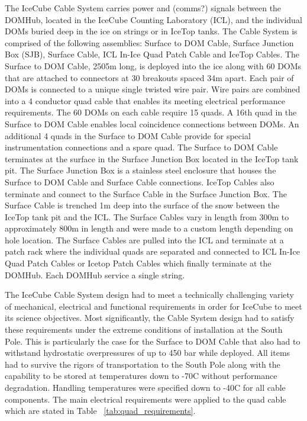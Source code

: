The IceCube Cable System carries power and (comms?) signals between the
DOMHub, located in the IceCube Counting Laboratory (ICL), and the
individual DOMs buried deep in the ice on strings or in IceTop tanks. The
Cable System is comprised of the following assemblies: Surface to DOM
Cable, Surface Junction Box (SJB), Surface Cable, ICL In-Ice Quad Patch
Cable and IceTop Cables. The Surface to DOM Cable, 2505m long, is deployed
into the ice along with 60 DOMs that are attached to connectors at 30
breakouts spaced 34m apart. Each pair of DOMs is connected to a unique
single twisted wire pair. Wire pairs are combined into a 4 conductor quad
cable that enables its meeting electrical performance requirements. The 60
DOMs on each cable require 15 quads. A 16th quad in the Surface to DOM
Cable enables local coincidence connections between DOMs. An additional 4
quads in the Surface to DOM Cable provide for special instrumentation
connections and a spare quad. The Surface to DOM Cable terminates at the
surface in the Surface Junction Box located in the IceTop tank pit. The
Surface Junction Box is a stainless steel enclosure that houses the Surface
to DOM Cable and Surface Cable connections. IceTop Cables also terminate
and connect to the Surface Cable in the Surface Junction Box. The Surface
Cable is trenched 1m deep into the surface of the snow between the IceTop
tank pit and the ICL. The Surface Cables vary in length from 300m to
approximately 800m in length and were made to a custom length depending on
hole location. The Surface Cables are pulled into the ICL and terminate at
a patch rack where the individual quads are separated and connected to ICL
In-Ice Quad Patch Cables or Icetop Patch Cables which finally terminate at
the DOMHub. Each DOMHub service a single string. 

The IceCube Cable System design had to meet a technically challenging
variety of mechanical, electrical and functional requirements in order for
IceCube to meet its science objectives. Most significantly, the Cable
System design had to satisfy these requirements under the extreme
conditions of installation at the South Pole. This is particularly the case
for the Surface to DOM Cable that also had to withstand hydrostatic
overpressures of up to 450 bar while deployed. All items had to survive the
rigors of transportation to the South Pole along with the capability to be
stored at temperatures down to -70C without performance
degradation. Handling temperatures were specified down to -40C for all
cable components. The main electrical requirements were applied to the quad
cable which are stated in Table ~\ref{tab:quad_requirements}.

